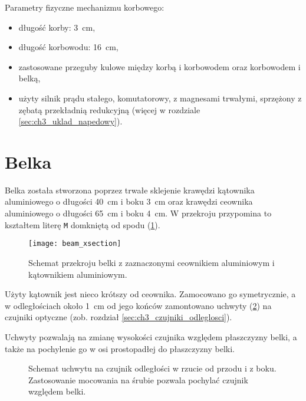 Parametry fizyczne mechanizmu korbowego:

\begin{itemize}
	\item długość korby: \SI{3}{cm},
	\item długość korbowodu: \SI{16}{cm},
	\item zastosowane przeguby kulowe między korbą i korbowodem oraz korbowodem i belką,
    \item użyty silnik prądu stałego, komutatorowy, z magnesami trwałymi, sprzężony z zębatą przekładnią redukcyjną (więcej w rozdziale \ref{sec:ch3_uklad_napedowy}).
\end{itemize}


\section{Belka}
\label{sec:ch2_belka}

Belka została stworzona poprzez trwałe sklejenie krawędzi kątownika aluminiowego o długości \SI{40}{cm} i boku \SI{3}{cm} oraz krawędzi ceownika aluminiowego o długości \SI{65}{cm} i boku \SI{4}{cm}. W przekroju przypomina to kształtem literę \texttt{M} domkniętą od spodu (\cref{fig:przekroj_belki}).

\begin{figure}[H]
	\centering
    \texttt{[image: beam\_xsection]}
	\caption{Schemat przekroju belki z zaznaczonymi ceownikiem aluminiowym i kątownikiem aluminiowym.}
	\label{fig:przekroj_belki}
\end{figure}

Użyty kątownik jest nieco krótszy od ceownika. Zamocowano go symetrycznie, a w odległościach około \SI{1}{cm} od jego końców zamontowano uchwyty (\cref{fig:uchwyt_czujnika_odleglosci}) na czujniki optyczne (zob. rozdział \ref{sec:ch3_czujniki_odleglosci}).

Uchwyty pozwalają na zmianę wysokości czujnika względem płaszczyzny belki, a także na pochylenie go w osi prostopadłej do płaszczyzny belki.

\begin{figure}[H]
    \centering
    
    \caption{Schemat uchwytu na czujnik odległości w rzucie od przodu i z boku. Zastosowanie mocowania na śrubie pozwala pochylać czujnik względem belki.}
    \label{fig:uchwyt_czujnika_odleglosci}
\end{figure}

